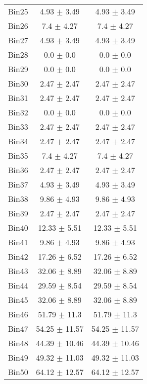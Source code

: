 \begin{tabular}{|c|c|c|}
     Bin25 & 4.93 $\pm$ 3.49 & 4.93 $\pm$ 3.49 \\ \cline{1-3} 
     Bin26 & 7.4 $\pm$ 4.27 & 7.4 $\pm$ 4.27 \\ \cline{1-3} 
     Bin27 & 4.93 $\pm$ 3.49 & 4.93 $\pm$ 3.49 \\ \cline{1-3} 
     Bin28 & 0.0 $\pm$ 0.0 & 0.0 $\pm$ 0.0 \\ \cline{1-3} 
     Bin29 & 0.0 $\pm$ 0.0 & 0.0 $\pm$ 0.0 \\ \cline{1-3} 
     Bin30 & 2.47 $\pm$ 2.47 & 2.47 $\pm$ 2.47 \\ \cline{1-3} 
     Bin31 & 2.47 $\pm$ 2.47 & 2.47 $\pm$ 2.47 \\ \cline{1-3} 
     Bin32 & 0.0 $\pm$ 0.0 & 0.0 $\pm$ 0.0 \\ \cline{1-3} 
     Bin33 & 2.47 $\pm$ 2.47 & 2.47 $\pm$ 2.47 \\ \cline{1-3} 
     Bin34 & 2.47 $\pm$ 2.47 & 2.47 $\pm$ 2.47 \\ \cline{1-3} 
     Bin35 & 7.4 $\pm$ 4.27 & 7.4 $\pm$ 4.27 \\ \cline{1-3} 
     Bin36 & 2.47 $\pm$ 2.47 & 2.47 $\pm$ 2.47 \\ \cline{1-3} 
     Bin37 & 4.93 $\pm$ 3.49 & 4.93 $\pm$ 3.49 \\ \cline{1-3} 
     Bin38 & 9.86 $\pm$ 4.93 & 9.86 $\pm$ 4.93 \\ \cline{1-3} 
     Bin39 & 2.47 $\pm$ 2.47 & 2.47 $\pm$ 2.47 \\ \cline{1-3} 
     Bin40 & 12.33 $\pm$ 5.51 & 12.33 $\pm$ 5.51 \\ \cline{1-3} 
     Bin41 & 9.86 $\pm$ 4.93 & 9.86 $\pm$ 4.93 \\ \cline{1-3} 
     Bin42 & 17.26 $\pm$ 6.52 & 17.26 $\pm$ 6.52 \\ \cline{1-3} 
     Bin43 & 32.06 $\pm$ 8.89 & 32.06 $\pm$ 8.89 \\ \cline{1-3} 
     Bin44 & 29.59 $\pm$ 8.54 & 29.59 $\pm$ 8.54 \\ \cline{1-3} 
     Bin45 & 32.06 $\pm$ 8.89 & 32.06 $\pm$ 8.89 \\ \cline{1-3} 
     Bin46 & 51.79 $\pm$ 11.3 & 51.79 $\pm$ 11.3 \\ \cline{1-3} 
     Bin47 & 54.25 $\pm$ 11.57 & 54.25 $\pm$ 11.57 \\ \cline{1-3} 
     Bin48 & 44.39 $\pm$ 10.46 & 44.39 $\pm$ 10.46 \\ \cline{1-3} 
     Bin49 & 49.32 $\pm$ 11.03 & 49.32 $\pm$ 11.03 \\ \cline{1-3} 
     Bin50 & 64.12 $\pm$ 12.57 & 64.12 $\pm$ 12.57 \\ \cline{1-3} 

\end{tabular}
